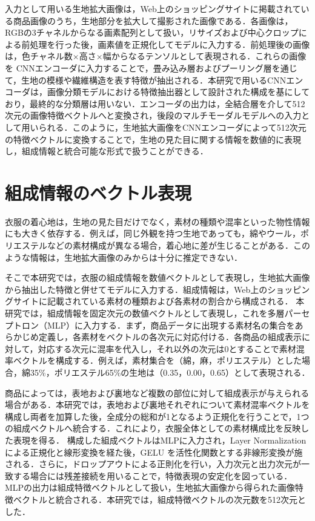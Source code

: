 \documentclass[a4paper,12pt]{jreport}
\begin{document}
入力として用いる生地拡大画像は，Web上のショッピングサイトに掲載されている商品画像のうち，生地部分を拡大して撮影された画像である．各画像は，RGBの3チャネルからなる画素配列として扱い，リサイズおよび中心クロップによる前処理を行った後，画素値を正規化してモデルに入力する．前処理後の画像は，色チャネル数×高さ×幅からなるテンソルとして表現される．これらの画像を CNNエンコーダに入力することで，畳み込み層およびプーリング層を通じて，生地の模様や繊維構造を表す特徴が抽出される．本研究で用いるCNNエンコーダは，画像分類モデルにおける特徴抽出器として設計された構成を基にしており，最終的な分類層は用いない．エンコーダの出力は，全結合層を介して512次元の画像特徴ベクトルへと変換され，後段のマルチモーダルモデルへの入力として用いられる．このように，生地拡大画像をCNNエンコーダによって512次元の特徴ベクトルに変換することで，生地の見た目に関する情報を数値的に表現し，組成情報と統合可能な形式で扱うことができる．


\section{組成情報のベクトル表現}

衣服の着心地は，生地の見た目だけでなく，素材の種類や混率といった物性情報にも大きく依存する．例えば，同じ外観を持つ生地であっても，綿やウール，ポリエステルなどの素材構成が異なる場合，着心地に差が生じることがある．このような情報は，生地拡大画像のみからは十分に推定できない．

そこで本研究では，衣服の組成情報を数値ベクトルとして表現し，生地拡大画像から抽出した特徴と併せてモデルに入力する．組成情報は，Web上のショッピングサイトに記載されている素材の種類および各素材の割合から構成される．
本研究では，組成情報を固定次元の数値ベクトルとして表現し，これを多層パーセプトロン（MLP）に入力する．まず，商品データに出現する素材名の集合をあらかじめ定義し，各素材をベクトルの各次元に対応付ける．各商品の組成表示に対して，対応する次元に混率を代入し，それ以外の次元は0とすることで素材混率ベクトルを構成する．例えば，素材集合を（綿，麻，ポリエステル）とした場合，綿35\%，ポリエステル65\%の生地は（0.35，0.00，0.65）として表現される．

商品によっては，表地および裏地など複数の部位に対して組成表示が与えられる場合がある．本研究では，表地および裏地それぞれについて素材混率ベクトルを構成し両者を加算した後，全成分の総和が1となるよう正規化を行うことで，1つの組成ベクトルへ統合する．これにより，衣服全体としての素材構成比を反映した表現を得る．
構成した組成ベクトルはMLPに入力され，Layer Normalization による正規化と線形変換を経た後，GELU を活性化関数とする非線形変換が施される．さらに，ドロップアウトによる正則化を行い，入力次元と出力次元が一致する場合には残差接続を用いることで，特徴表現の安定化を図っている．MLPの出力は組成特徴ベクトルとして扱い，生地拡大画像から得られた画像特徴ベクトルと統合される．本研究では，組成特徴ベクトルの次元数を512次元とした．
\end{document}
